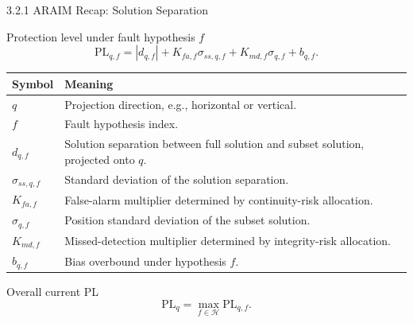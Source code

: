 \documentclass[10pt,aspectratio=169,xcolor=dvipsnames]{beamer}
\newcommand{\PL}{\mathrm{PL}}
\newcommand{\Hset}{\mathcal{H}}
\begin{document}
\begin{frame}{3.2.1 ARAIM Recap: Solution Separation}
  \small
  \begin{block}{Protection level under fault hypothesis $f$}
    \[
      \PL_{q,f}=|d_{q,f}|+K_{fa,f}\sigma_{ss,q,f}+K_{md,f}\sigma_{q,f}+b_{q,f}.
    \]
  \end{block}

  \begin{table}\scriptsize
    \begin{tabular}{p{} p{}}
      \toprule
      \textbf{Symbol} & \textbf{Meaning}\\
      \midrule
      $q$ & Projection direction, e.g., horizontal or vertical.\\
      $f$ & Fault hypothesis index.\\
      $d_{q,f}$ & Solution separation between full solution and subset solution, projected onto $q$.\\
      $\sigma_{ss,q,f}$ & Standard deviation of the solution separation.\\
      $K_{fa,f}$ & False-alarm multiplier determined by continuity-risk allocation.\\
      $\sigma_{q,f}$ & Position standard deviation of the subset solution.\\
      $K_{md,f}$ & Missed-detection multiplier determined by integrity-risk allocation.\\
      $b_{q,f}$ & Bias overbound under hypothesis $f$.\\
      \bottomrule
    \end{tabular}
  \end{table}

  \begin{block}{Overall current PL}
    \[
      \PL_q=\max_{f\in\Hset}\PL_{q,f}.
    \]
  \end{block}
\end{frame}
\end{document}
